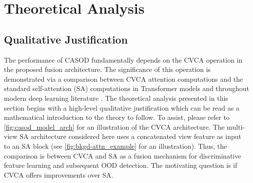 \section{Theoretical Analysis}
\label{sec:propwork-casod-theory}

\subsection{Qualitative Justification}

The performance of CASOD fundamentally depends on the CVCA operation in the proposed fusion architecture. The significance of this operation is demonstrated via a comparison between CVCA attention computations and the standard self-attention (SA) computations in Transformer models \cite{vaswani2017attention} and throughout modern deep learning literature \cite{vaswani2017attention,dosovitskiy2020image,khan2023survey}. The theoretical analysis presented in this section begins with a high-level qualitative justification which can be read as a mathematical introduction to the theory to follow. To assist, please refer to \ref{fig:casod_model_arch} for an illustration of the CVCA architecture. The multi-view SA architecture considered here uses a concatenated view feature as input to an SA block (see \ref{fig:bkgd-attn_example} for an illustration). Thus, the comparison is between CVCA and SA as a fusion mechanism for discriminative feature learning and subsequent OOD detection. The motivating question is if CVCA offers improvements over SA.

